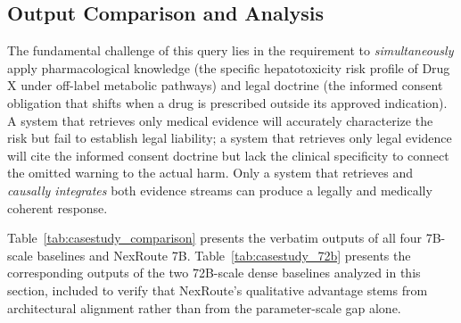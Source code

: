 \documentclass[a4paper,fleql]{cas-sc}
\begin{document}
\subsection{Output Comparison and Analysis}
\label{ssec:output}
The fundamental challenge of this query lies in the requirement to
\emph{simultaneously} apply pharmacological knowledge (the specific
hepatotoxicity risk profile of Drug X under off-label metabolic pathways) and
legal doctrine (the informed consent obligation that shifts when a drug is
prescribed outside its approved indication). A system that retrieves only
medical evidence will accurately characterize the risk but fail to establish
legal liability; a system that retrieves only legal evidence will cite the
informed consent doctrine but lack the clinical specificity to connect the
omitted warning to the actual harm. Only a system that retrieves and
\emph{causally integrates} both evidence streams can produce a legally and
medically coherent response.

Table~\ref{tab:casestudy_comparison} presents the verbatim outputs of all
four 7B-scale baselines and NexRoute 7B. Table~\ref{tab:casestudy_72b}
presents the corresponding outputs of the two 72B-scale dense baselines
analyzed in this section, included to verify that NexRoute's qualitative
advantage stems from architectural alignment rather than from the
parameter-scale gap alone.
\end{document}
